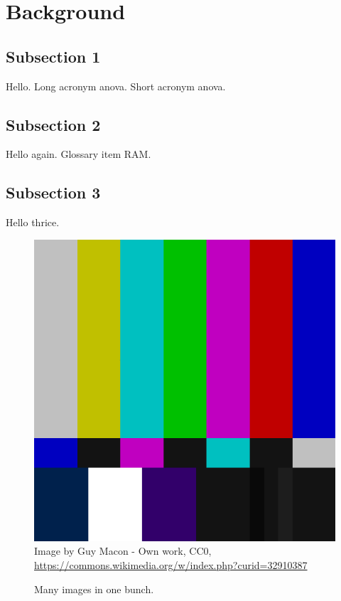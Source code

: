 \section{Background}
\label{sec:background}

\subsection{Subsection 1}
\justify
Hello. Long acronym \acrfull{anova}. Short acronym \acrshort{anova}.

\subsection{Subsection 2}
\justify
Hello again. Glossary item \gls{RAM}.

\subsection{Subsection 3}
\justify
Hello thrice.


\begin{figure}[H]%
    \centering
    \includegraphics[width=.5\textwidth]{images/500_x_500_SMPTE_Color_Bars.png}
    \caption[Nice image]{Image by Guy Macon - Own work, CC0, \textcolor{blue}{\url{https://commons.wikimedia.org/w/index.php?curid=32910387}}}%
    \label{fig:image1}%
\end{figure}

\begin{figure}[H]%
    \centering
    \quad
    \quad
    \caption[dsa]{Many images in one bunch.}%
    \label{fig:tripleimage}%
\end{figure}